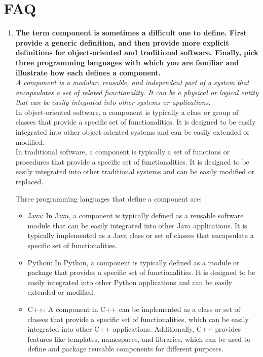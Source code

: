 \documentclass[11pt]{article}
\begin{document}
\section{FAQ}
\begin{enumerate}
	\item \textbf{The term component is sometimes a difficult one to define. First provide a generic definition, and then provide more explicit definitions for object-oriented and traditional software. Finally, pick three programming languages with which you are familiar and illustrate how each defines a component.}\\
	
	\textit{A component is a modular, reusable, and independent part of a system that encapsulates a set of related functionality. It can be a physical or logical entity that can be easily integrated into other systems or applications.}\\

	In object-oriented software, a component is typically a class or group of classes that provide a specific set of functionalities. It is designed to be easily integrated into other object-oriented systems and can be easily extended or modified.\\
	
	In traditional software, a component is typically a set of functions or procedures that provide a specific set of functionalities. It is designed to be easily integrated into other traditional systems and can be easily modified or replaced.
	
	Three programming languages that define a component are:
	
	\begin{itemize}
		\item Java: In Java, a component is typically defined as a reusable software module that can be easily integrated into other Java applications. It is typically implemented as a Java class or set of classes that encapsulate a specific set of functionalities.
		
		\item Python: In Python, a component is typically defined as a module or package that provides a specific set of functionalities. It is designed to be easily integrated into other Python applications and can be easily extended or modified.
		
		\item C++: A component in C++ can be implemented as a class or set of classes that provide a specific set of functionalities, which can be easily integrated into other C++ applications. Additionally, C++ provides features like templates, namespaces, and libraries, which can be used to define and package reusable components for different purposes.
	\end{itemize}
	

\end{enumerate}
\end{document}
